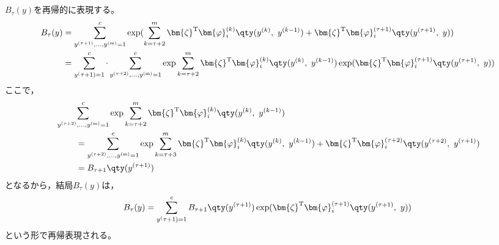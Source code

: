 \documentclass[class=jsarticle, crop=false, dvipdfmx, fleqn]{standalone}
\begin{document}
\section{}

\(B_{\tau} (y)\)を再帰的に表現する。
\begin{align}
    B_{\tau} (y)
        & =
            \sum_{ y^{(\tau + 1)}, \ldots , y^\mathrm{(m)} = 1 }^{c}
            \exp(
                \sum_{k=\tau + 2}^{m} \bm{\zeta}^\mathrm{T} \bm{\varphi}_i^{(k)} \qty(y^{(k)},\ y^{(k-1)})
                + \bm{\zeta}^\mathrm{T} \bm{\varphi}_i^{(\tau + 1)} \qty(y^{(\tau + 1)},\ y)
                ) \\
        & =
            \sum_{y^(\tau + 1) = 1}^{c} \cdot \sum_{ y^{(\tau + 2)}, \ldots , y^\mathrm{(m)} = 1 }^{c}
            \exp{\sum_{k=\tau + 2}^{m} \bm{\zeta}^\mathrm{T} \bm{\varphi}_i^{(k)} \qty(y^{(k)},\ y^{(k-1)})}
            \exp(\bm{\zeta}^\mathrm{T} \bm{\varphi}_i^{(\tau + 1)} \qty(y^{(\tau + 1)},\ y))
\end{align}
ここで，
\begin{align}
    & \sum_{ y^{(\tau + 2)}, \ldots , y^\mathrm{(m)} = 1 }^{c}
        \exp{\sum_{k=\tau + 2}^{m} \bm{\zeta}^\mathrm{T} \bm{\varphi}_i^{(k)} \qty(y^{(k)},\ y^{(k-1)})} \notag \\
    & \ \qquad =
        \sum_{ y^{(\tau + 2)}, \ldots , y^\mathrm{(m)} = 1 }^{c}
            \exp{
                \sum_{k=\tau + 3}^{m} \bm{\zeta}^\mathrm{T} \bm{\varphi}_i^{(k)} \qty(y^{(k)},\ y^{(k-1)})
                + \bm{\zeta}^\mathrm{T} \bm{\varphi}_i^{(\tau + 2)} \qty(y^{(\tau + 2)},\ y^{(\tau + 1)})
                } \\
    & \ \qquad =
        B_{\tau + 1}\qty(y^{(\tau + 1)})
\end{align}
となるから，結局\(B_{\tau} (y)\)は，
\begin{equation}
    B_{\tau} (y) = \sum_{y^(\tau + 1) = 1}^{c} B_{\tau + 1}\qty(y^{(\tau + 1)}) \exp(\bm{\zeta}^\mathrm{T} \bm{\varphi}_i^{(\tau + 1)} \qty(y^{(\tau + 1)},\ y))
\end{equation}
という形で再帰表現される。
\end{document}
